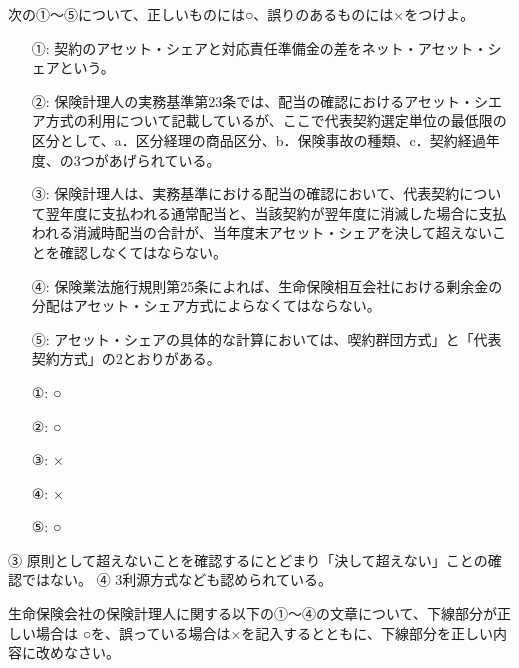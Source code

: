 \documentclass[report,gutter=10mm,fore-edge=10mm,uplatex,dvipdfmx]{jlreq}
\begin{document}
次の①〜⑤について、正しいものには○、誤りのあるものには×をつけよ。

\begin{itemize}
\item[ ①: ] 契約のアセット・シェアと対応責任準備金の差をネット・アセット・シェアという。
\item[ ②: ] 保険計理人の実務基準第23条では、配当の確認におけるアセット・シエア方式の利用について記載しているが、ここで代表契約選定単位の最低限の区分として、a．区分経理の商品区分、b．保険事故の種類、c．契約経過年度、の3つがあげられている。
\item[ ③: ] 保険計理人は、実務基準における配当の確認において、代表契約について翌年度に支払われる通常配当と、当該契約が翌年度に消滅した場合に支払われる消滅時配当の合計が、当年度末アセット・シェアを決して超えないことを確認しなくてはならない。
\item[ ④: ] 保険業法施行規則第25条によれば、生命保険相互会社における剰余金の分配はアセット・シェア方式によらなくてはならない。
\item[ ⑤: ] アセット・シェアの具体的な計算においては、喫約群団方式」と「代表契約方式」の2とおりがある。
\end{itemize}

\answer{}

\begin{itemize}
\item[ ①: ] ○
\item[ ②: ] ○
\item[ ③: ] ×
\item[ ④: ] ×
\item[ ⑤: ] ○
\end{itemize}

③ 原則として超えないことを確認するにとどまり「決して超えない」ことの確認ではない。
④ 3利源方式なども認められている。


生命保険会社の保険計理人に関する以下の①～④の文章について、下線部分が正しい場合は
○を、誤っている場合は×を記入するとともに、下線部分を正しい内容に改めなさい。
\end{document}
